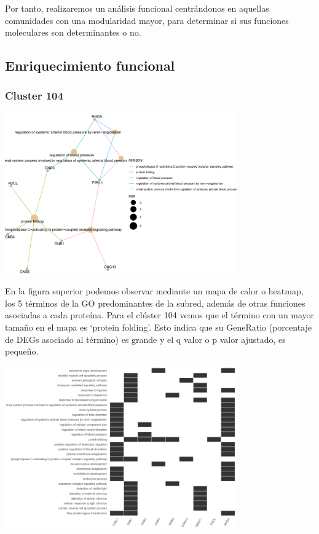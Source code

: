 Por tanto, realizaremos un análisis funcional centrándonos en aquellas comunidades con una modularidad mayor, para determinar si sus funciones moleculares son determinantes o no.

\subsection{Enriquecimiento funcional}
\subsubsection{Cluster 104}

\begin{center}
\vspace{1.5ex}
\includegraphics[width=100mm,scale=1.1]{report/figures/enrichGO_heatmap_cnetplot-BP-104-2.PNG}
\vspace{1.5ex}
\end{center}


En la figura superior podemos observar mediante un mapa de calor o heatmap, los 5 términos de la GO predominantes de la subred, además de otras funciones asociadas a cada proteína. 
Para el clúster 104 vemos que el término con un mayor tamaño en el mapa es ‘protein folding’. Esto indica que su GeneRatio (porcentaje de DEGs asociado al término) es grande y el q valor o p valor ajustado, es pequeño.


\begin{center}
\vspace{1.5ex}
\includegraphics[width=100mm,scale=1.1]{report/figures/enrichGO_heatmap_cnetplot-BP-104-1.PNG}
\vspace{1.5ex}
\end{center}


